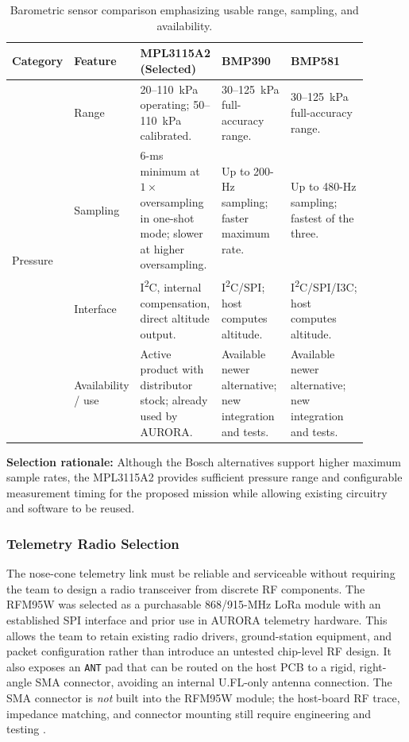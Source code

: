 \documentclass[11pt]{IEEEtran}
\begin{document}
\begin{table}[H]
\centering\small
\begin{tabular}{@{}p{0.11\linewidth}p{0.14\linewidth}p{0.215\linewidth}p{0.215\linewidth}p{0.215\linewidth}@{}}
\toprule
\textbf{Category} & \textbf{Feature} & \textbf{MPL3115A2 (Selected)} & \textbf{BMP390} & \textbf{BMP581} \\
\midrule
\multirow{4}{*}{Pressure}
 & Range & 20--110~kPa operating; 50--110~kPa calibrated. & 30--125~kPa full-accuracy range. & 30--125~kPa full-accuracy range. \\ \cmidrule{2-5}
 & Sampling & 6-ms minimum at $1\times$ oversampling in one-shot mode; slower at higher oversampling. & Up to 200-Hz sampling; faster maximum rate. & Up to 480-Hz sampling; fastest of the three. \\ \cmidrule{2-5}
 & Interface & I\textsuperscript{2}C, internal compensation, direct altitude output. & I\textsuperscript{2}C/SPI; host computes altitude. & I\textsuperscript{2}C/SPI/I3C; host computes altitude. \\ \cmidrule{2-5}
 & Availability / use & Active product with distributor stock; already used by AURORA. & Available newer alternative; new integration and tests. & Available newer alternative; new integration and tests. \\
\bottomrule
\end{tabular}
\vspace{3mm}
\caption{Barometric sensor comparison emphasizing usable range, sampling, and availability.}
\label{tab:Pressure_Comparison}
\end{table}

\noindent\textbf{Selection rationale:} Although the Bosch alternatives support higher maximum sample rates, the MPL3115A2 provides sufficient pressure range and configurable measurement timing for the proposed mission while allowing existing circuitry and software to be reused.

\subsubsection{Telemetry Radio Selection}
The nose-cone telemetry link must be reliable and serviceable without requiring the team to design a radio transceiver from discrete RF components. The RFM95W was selected as a purchasable 868/915-MHz LoRa module with an established SPI interface and prior use in AURORA telemetry hardware. This allows the team to retain existing radio drivers, ground-station equipment, and packet configuration rather than introduce an untested chip-level RF design. It also exposes an \texttt{ANT} pad that can be routed on the host PCB to a rigid, right-angle SMA connector, avoiding an internal U.FL-only antenna connection. The SMA connector is \emph{not} built into the RFM95W module; the host-board RF trace, impedance matching, and connector mounting still require engineering and testing \cite{rfm95,sx1262,sx1280}.
\end{document}
